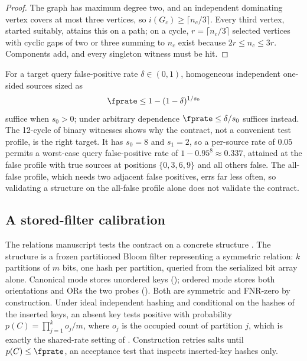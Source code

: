 \begin{proof}
The graph has maximum degree two, and an independent dominating vertex covers at
most three vertices, so $i(G_c) \ge \lceil n_c / 3 \rceil$. Every third vertex,
started suitably, attains this on a path; on a cycle, $r = \lceil n_c/3 \rceil$
selected vertices with cyclic gaps of two or three summing to $n_c$ exist because
$2r \le n_c \le 3r$. Components add, and every singleton witness must be hit.
\end{proof}

For a target query false-positive rate $\delta \in (0, 1)$, homogeneous
independent one-sided sources sized as
\begin{equation}
\label{eq:query-calibration}
  \fprate \le 1 - (1 - \delta)^{1/s_0}
\end{equation}
suffice when $s_0 > 0$; under arbitrary dependence $\fprate \le \delta / s_0$
suffices instead. The 12-cycle of binary witnesses shows why the contract, not a
convenient test profile, is the right target. It has $s_0 = 8$ and $s_1 = 2$, so a
per-source rate of $0.05$ permits a worst-case query false-positive rate of $1 -
0.95^8 \approx 0.337$, attained at the false profile with true sources at
positions $\{0, 3, 6, 9\}$ and all others false. The all-false profile, which needs
two adjacent false positives, errs far less often, so validating a structure on
the all-false profile alone does not validate the contract.

\subsection*{A stored-filter calibration}

The relations manuscript tests the contract on a concrete structure
\parencite[Sec.~7]{towell-bernoulli-relations}. The structure is a frozen
partitioned Bloom filter representing a symmetric relation: $k$
partitions of $m$ bits, one hash per partition, queried from the serialized bit
array alone. Canonical mode stores unordered keys ();
ordered mode stores both orientations and ORs the two probes
(). Both are symmetric and FNR-zero by
construction. Under ideal independent hashing and conditional on the hashes of the
inserted keys, an absent key tests positive with probability $p(C) = \prod_{j=1}^{k}
o_j / m$, where $o_j$ is the occupied count of partition $j$, which is exactly the
shared-rate setting of . Construction retries
salts until $p(C) \le \fprate$, an acceptance test that inspects inserted-key hashes
only.

